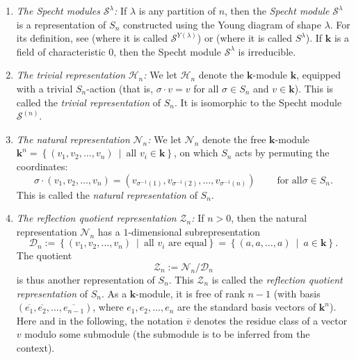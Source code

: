 \documentclass[numbers=enddot,12pt,final,onecolumn,notitlepage]{scrartcl}%
\theoremstyle{definition}
\begin{document}
\begin{enumerate}
\item \emph{The Specht modules }$\mathcal{S}^{\lambda}$\emph{:} If $\lambda$
is any partition of $n$, then the \emph{Specht module} $\mathcal{S}^{\lambda}$
is a representation of $S_{n}$ constructed using the Young diagram of shape
$\lambda$. For its definition, see \cite[Definition 5.4.1 \textbf{(b)}]{sga}
(where it is called $\mathcal{S}^{Y\left(  \lambda\right)  }$) or
\cite[\S 7.2]{Fulton97} (where it is called $S^{\lambda}$). If $\mathbf{k}$ is
a field of characteristic $0$, then the Specht module $\mathcal{S}^{\lambda}$
is irreducible.

\item \emph{The trivial representation }$\mathcal{H}_{n}$\emph{:} We let
$\mathcal{H}_{n}$ denote the $\mathbf{k}$-module $\mathbf{k}$, equipped with a
trivial $S_{n}$-action (that is, $\sigma\cdot v=v$ for all $\sigma\in S_{n}$
and $v\in\mathbf{k}$). This is called the \emph{trivial representation} of
$S_{n}$. It is isomorphic to the Specht module $\mathcal{S}^{\left(  n\right)
}$.

\item \emph{The natural representation }$\mathcal{N}_{n}$\emph{:} We let
$\mathcal{N}_{n}$ denote the free $\mathbf{k}$-module $\mathbf{k}^{n}=\left\{
\left(  v_{1},v_{2},\ldots,v_{n}\right)  \ \mid\ \text{all }v_{i}\in
\mathbf{k}\right\}  $, on which $S_{n}$ acts by permuting the coordinates:%
\[
\sigma\cdot\left(  v_{1},v_{2},\ldots,v_{n}\right)  =\left(  v_{\sigma
^{-1}\left(  1\right)  },v_{\sigma^{-1}\left(  2\right)  },\ldots
,v_{\sigma^{-1}\left(  n\right)  }\right)  \ \ \ \ \ \ \ \ \ \ \text{for all
}\sigma\in S_{n}.
\]
This is called the \emph{natural representation} of $S_{n}$.

\item \emph{The reflection quotient representation }$\mathcal{Z}_{n}$\emph{:}
If $n>0$, then the natural representation $\mathcal{N}_{n}$ has a
$1$-dimensional subrepresentation
\[
\mathcal{D}_{n}:=\left\{  \left(  v_{1},v_{2},\ldots,v_{n}\right)
\ \mid\ \text{all }v_{i}\text{ are equal}\right\}  =\left\{  \left(
a,a,\ldots,a\right)  \ \mid\ a\in\mathbf{k}\right\}  .
\]
The quotient
\[
\mathcal{Z}_{n}:=\mathcal{N}_{n}/\mathcal{D}_{n}%
\]
is thus another representation of $S_{n}$. This $\mathcal{Z}_{n}$ is called
the \emph{reflection quotient representation} of $S_{n}$. As a $\mathbf{k}%
$-module, it is free of rank $n-1$ (with basis $\left(  \overline{e_{1}%
},\overline{e_{2}},\ldots,\overline{e_{n-1}}\right)  $, where $e_{1}%
,e_{2},\ldots,e_{n}$ are the standard basis vectors of $\mathbf{k}^{n}$). Here
and in the following, the notation $\overline{v}$ denotes the residue class of
a vector $v$ modulo some submodule (the submodule is to be inferred from the context).


\end{enumerate}
\end{document}
